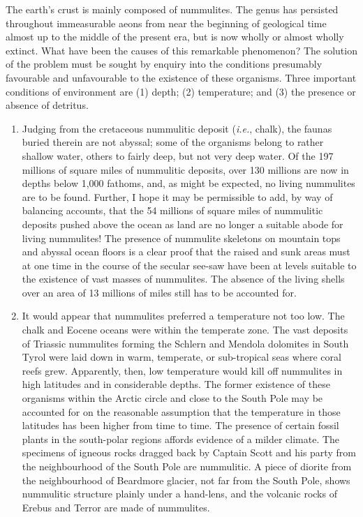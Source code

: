 \documentclass[a4paper, 12pt, oneside, landscape]{article}
\begin{document}
The earth's crust is mainly composed of nummulites. The genus has persisted throughout immeasurable aeons from near the beginning of geological time almost up to the middle of the present era, but is now wholly or almost wholly extinct. What have been the causes of this remarkable phenomenon? The solution of the problem must be sought by enquiry into the conditions presumably favourable and unfavourable to the existence of these organisms. Three important conditions of environment are (1) depth; (2) temperature; and (3) the presence or absence of detritus.
\begin{enumerate}
    \item Judging from the cretaceous nummulitic deposit (\emph{i.e.}, chalk), the faunas buried therein are not abyssal; some of the organisms belong to rather shallow water, others to fairly deep, but not very deep water. Of the 197 millions of square miles of nummulitic deposits, over 130 millions are now in depths below 1,000 fathoms, and, as might be expected, no living nummulites are to be found. Further, I hope it may be permissible to add, by way of balancing accounts, that the 54 millions of square miles of nummulitic deposits pushed above the ocean as land are no longer a suitable abode for living nummulites! The presence of nummulite skeletons on mountain tops and abyssal ocean floors is a clear proof that the raised and sunk areas must at one time in the course of the secular see-saw have been at levels suitable to the existence of vast masses of nummulites. The absence of the living shells over an area of 13 millions of miles still has to be accounted for.
    \item It would appear that nummulites preferred a temperature not too low. The chalk and Eocene oceans were within the temperate zone. The vast deposits of Triassic nummulites forming the Schlern and Mendola dolomites in South Tyrol were laid down in warm, temperate, or sub-tropical seas where coral reefs grew. Apparently, then, low temperature would kill off nummulites in high latitudes and in considerable depths. The former existence of these organisms within the Arctic circle and close to the South Pole may be accounted for on the reasonable assumption that the temperature in those latitudes has been higher from time to time. The presence of certain fossil plants in the south-polar regions affords evidence of a milder climate. The specimens of igneous rocks dragged back by Captain Scott and his party from the neighbourhood of the South Pole are nummulitic. A piece of diorite from the neighbourhood of Beardmore glacier, not far from the South Pole, shows nummulitic structure plainly under a hand-lens, and the volcanic rocks of Erebus and Terror are made of nummulites.
\end{enumerate}
\end{document}
